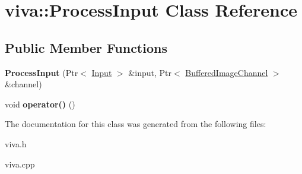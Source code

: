 \hypertarget{classviva_1_1_process_input}{}\section{viva\+:\+:Process\+Input Class Reference}
\label{classviva_1_1_process_input}
\subsection*{Public Member Functions}
\begin{DoxyCompactItemize}
\item 
{\bfseries Process\+Input} (Ptr$<$ \hyperlink{classviva_1_1_input}{Input} $>$ \&input, Ptr$<$ \hyperlink{classviva_1_1_buffered_channel}{Buffered\+Image\+Channel} $>$ \&channel)\hypertarget{classviva_1_1_process_input_a3c7834fde58d3864f0de2a4ef1f91242}{}\label{classviva_1_1_process_input_a3c7834fde58d3864f0de2a4ef1f91242}

\item 
void {\bfseries operator()} ()\hypertarget{classviva_1_1_process_input_a3c4525e0a526cf2e2df5ee934463bf9c}{}\label{classviva_1_1_process_input_a3c4525e0a526cf2e2df5ee934463bf9c}

\end{DoxyCompactItemize}


The documentation for this class was generated from the following files\+:\begin{DoxyCompactItemize}
\item 
viva.\+h\item 
viva.\+cpp\end{DoxyCompactItemize}
